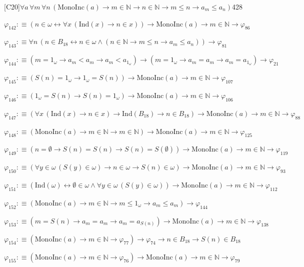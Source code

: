 \begin{fullproof}{[C20]}{$\forall a\,\forall m\,\forall n\,(\mathrm{MonoInc}(a) \to m \in \mathbb{N} \to n \in \mathbb{N} \to m \leq n \to a_{m} \leq a_{n})$}{428}
\begin{abbrevlist}
\item $\varphi_{142} :\equiv (n \in \omega \leftrightarrow \forall x\,(\mathrm{Ind}(x) \to n \in x)) \to \mathrm{MonoInc}(a) \to m \in \mathbb{N} \to \varphi_{86}$
\item $\varphi_{143} :\equiv \forall n\,(n \in B_{18} \leftrightarrow n \in \omega \land (n \in \mathbb{N} \to m \leq n \to a_{m} \leq a_{n})) \to \varphi_{81}$
\item $\varphi_{144} :\equiv (m = 1_{\omega} \to a_{m} < a_{m} \to a_{m} < a_{1_{\omega}}) \to (m = 1_{\omega} \to a_{m} = a_{m} \to a_{m} = a_{1_{\omega}}) \to \varphi_{21}$
\item $\varphi_{145} :\equiv (S(n) = 1_{\omega} \to 1_{\omega} = S(n)) \to \mathrm{MonoInc}(a) \to m \in \mathbb{N} \to \varphi_{107}$
\item $\varphi_{146} :\equiv (1_{\omega} = S(n) \to S(n) = 1_{\omega}) \to \mathrm{MonoInc}(a) \to m \in \mathbb{N} \to \varphi_{106}$
\item $\varphi_{147} :\equiv (\forall x\,(\mathrm{Ind}(x) \to n \in x) \to \mathrm{Ind}(B_{18}) \to n \in B_{18}) \to \mathrm{MonoInc}(a) \to m \in \mathbb{N} \to \varphi_{88}$
\item $\varphi_{148} :\equiv (\mathrm{MonoInc}(a) \to m \in \mathbb{N} \to m \in \mathbb{N}) \to \mathrm{MonoInc}(a) \to m \in \mathbb{N} \to \varphi_{125}$
\item $\varphi_{149} :\equiv (n = \emptyset \to S(n) = S(n) \to S(n) = S(\emptyset)) \to \mathrm{MonoInc}(a) \to m \in \mathbb{N} \to \varphi_{119}$
\item $\varphi_{150} :\equiv (\forall y \in \omega\,(S(y) \in \omega) \to n \in \omega \to S(n) \in \omega) \to \mathrm{MonoInc}(a) \to m \in \mathbb{N} \to \varphi_{93}$
\item $\varphi_{151} :\equiv (\mathrm{Ind}(\omega) \leftrightarrow \emptyset \in \omega \land \forall y \in \omega\,(S(y) \in \omega)) \to \mathrm{MonoInc}(a) \to m \in \mathbb{N} \to \varphi_{112}$
\item $\varphi_{152} :\equiv (\mathrm{MonoInc}(a) \to m \in \mathbb{N} \to m \leq 1_{\omega} \to a_{m} \leq a_{m}) \to \varphi_{144}$
\item $\varphi_{153} :\equiv (m = S(n) \to a_{m} = a_{m} \to a_{m} = a_{S(n)}) \to \mathrm{MonoInc}(a) \to m \in \mathbb{N} \to \varphi_{138}$
\item $\varphi_{154} :\equiv (\mathrm{MonoInc}(a) \to m \in \mathbb{N} \to \varphi_{77}) \to \varphi_{74} \to n \in B_{18} \to S(n) \in B_{18}$
\item $\varphi_{155} :\equiv (\mathrm{MonoInc}(a) \to m \in \mathbb{N} \to \varphi_{76}) \to \mathrm{MonoInc}(a) \to m \in \mathbb{N} \to \varphi_{79}$

\end{abbrevlist}
\end{fullproof}
